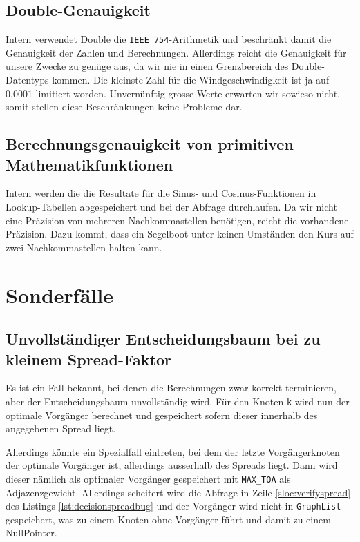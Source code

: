 \subsection{Double-Genauigkeit}
Intern verwendet Double die \texttt{IEEE 754}-Arithmetik und beschränkt damit
die Genauigkeit der Zahlen und Berechnungen. Allerdings reicht die Genauigkeit
für unsere Zwecke zu genüge aus, da wir nie in einen Grenzbereich des
Double-Datentyps kommen. Die kleinste Zahl für die Windgeschwindigkeit ist ja
auf $0.0001$ limitiert worden. Unvernünftig grosse Werte erwarten wir sowieso
nicht, somit stellen diese Beschränkungen keine Probleme dar.

\subsection{Berechnungsgenauigkeit von primitiven Mathematikfunktionen}
Intern werden die die Resultate für die Sinus- und Cosinus-Funktionen in
Lookup-Tabellen abgespeichert und bei der Abfrage durchlaufen. Da wir nicht
eine Präzision von mehreren Nachkommastellen benötigen, reicht die vorhandene
Präzision. Dazu kommt, dass ein Segelboot unter keinen Umständen den Kurs auf
zwei Nachkommastellen halten kann.

\section{Sonderfälle}
\subsection{Unvollständiger Entscheidungsbaum bei zu kleinem Spread-Faktor}
Es ist ein Fall bekannt, bei denen die Berechnungen zwar korrekt terminieren,
aber der Entscheidungsbaum unvollständig wird. Für den Knoten \texttt{k} wird
nun der optimale Vorgänger berechnet und gespeichert sofern dieser innerhalb
des angegebenen Spread liegt.

Allerdings könnte ein Spezialfall eintreten, bei dem der letzte
Vorgängerknoten der optimale Vorgänger ist, allerdings ausserhalb des Spreads
liegt. Dann wird dieser nämlich als optimaler Vorgänger gespeichert mit
\texttt{MAX\_TOA} als Adjazenzgewicht. Allerdings scheitert wird die Abfrage
in Zeile \ref{sloc:verifyspread} des Listings \ref{lst:decisionspreadbug} und
der Vorgänger wird nicht in \texttt{GraphList} gespeichert, was zu einem
Knoten ohne Vorgänger führt und damit zu einem NullPointer.

